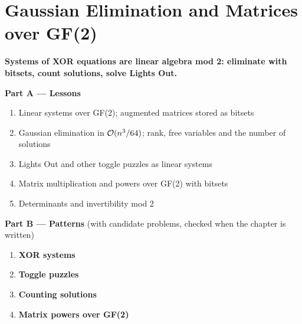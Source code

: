 \chapter{Gaussian Elimination and Matrices over GF(2)}
\label{ch:gf2}

\begin{tcolorbox}[enhanced, colback=white, colframe=secondaryblue, boxrule=1pt, arc=2mm]
\textbf{\large\textcolor{primaryblue}{Systems of XOR equations are linear algebra mod 2: eliminate with bitsets, count solutions, solve Lights Out.}}
\end{tcolorbox}


\begin{plannedbox}
\textbf{Part A --- Lessons}
\begin{enumerate}[leftmargin=*, label=\textbf{A\arabic*.}, itemsep=1pt]
    \item Linear systems over GF(2); augmented matrices stored as bitsets
    \item Gaussian elimination in $\mathcal{O}(n^3/64)$; rank, free variables and the number of solutions
    \item Lights Out and other toggle puzzles as linear systems
    \item Matrix multiplication and powers over GF(2) with bitsets
    \item Determinants and invertibility mod 2
\end{enumerate}
\textbf{Part B --- Patterns} (with candidate problems, checked when the chapter is written)
\begin{enumerate}[leftmargin=*, label=\textbf{P\arabic*.}, itemsep=1pt]
    \item \textbf{XOR systems}
    \item \textbf{Toggle puzzles}
    \item \textbf{Counting solutions}
    \item \textbf{Matrix powers over GF(2)}
\end{enumerate}
\end{plannedbox}

